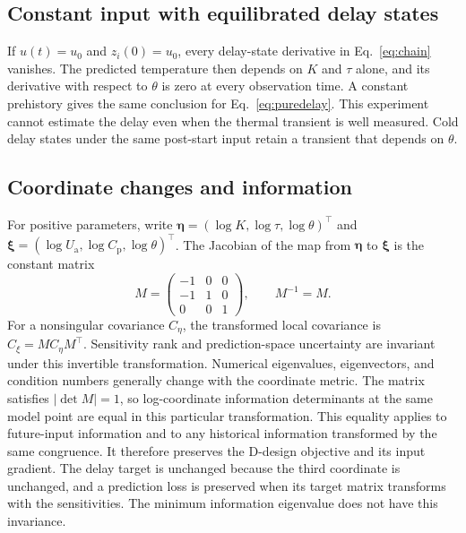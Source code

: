 \documentclass[11pt]{article}
\newcommand{\Ua}{U_{\mathrm a}}
\newcommand{\Cp}{C_{\mathrm p}}
\begin{document}
\subsection{Constant input with equilibrated delay states}
If $u(t)=u_0$ and $z_i(0)=u_0$, every delay-state derivative in
Eq.~\eqref{eq:chain} vanishes. The predicted temperature then depends on
$K$ and $\tau$ alone, and its derivative with respect to $\theta$ is zero at
every observation time. A constant prehistory gives the same conclusion for
Eq.~\eqref{eq:puredelay}. This experiment cannot estimate the delay even when
the thermal transient is well measured. Cold delay states under the same
post-start input retain a transient that depends on $\theta$.

\subsection{Coordinate changes and information}
For positive parameters, write $\bm\eta=(\log K,\log\tau,\log\theta)^\top$
and $\bm\xi=(\log\Ua,\log\Cp,\log\theta)^\top$. The Jacobian of the map
from $\bm\eta$ to $\bm\xi$ is the constant matrix
\[
 M=\begin{pmatrix}-1&0&0\\-1&1&0\\0&0&1\end{pmatrix},\qquad M^{-1}=M.
\]
For a nonsingular covariance $C_{\eta}$, the transformed local covariance is
$C_{\xi}=M C_{\eta}M^\top$. Sensitivity rank and prediction-space uncertainty
are invariant under this invertible transformation. Numerical eigenvalues,
eigenvectors, and condition numbers generally change with the coordinate metric.
The matrix satisfies $|\det M|=1$, so log-coordinate information determinants
at the same model point are equal in this particular transformation.
This equality applies to future-input information and to any historical
information transformed by the same congruence. It therefore preserves the
D-design objective and its input gradient. The delay target is unchanged
because the third coordinate is unchanged, and a prediction loss is preserved
when its target matrix transforms with the sensitivities. The minimum
information eigenvalue does not have this invariance.
\end{document}
